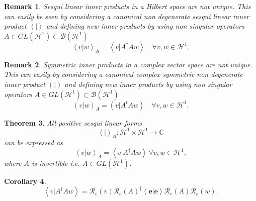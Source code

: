 \documentclass[aps,preprint]{revtex4}%
\newtheorem{theorem}{Theorem}
\newtheorem{corollary}[theorem]{Corollary}
\newtheorem{remark}[theorem]{Remark}
\begin{document}
\begin{remark}
\emph{Sesqui linear inner products in a Hilbert space are not unique. This can
easily be seen by considering a canonical non degenerate sesqui linear inner
product }$\left\langle \left.  {}\right\vert \right\rangle $ \emph{and
defining new inner products} by using non singular operators $A\in GL\left(
\mathcal{H}^{1}\right)  \subset\mathcal{B}\left(  \mathcal{H}^{1}\right)  $
\emph{ }%
\begin{equation}
\left\langle \left.  v\right\vert w\right\rangle _{A}=\left\langle \left.
v\right\vert A^{\dagger}Aw\right\rangle \quad\forall v,w\in\mathcal{H}^{1}.
\end{equation}

\end{remark}

\begin{remark}
\emph{Symmetric inner products in a complex vector space are not unique. This
can easily by considering a canonical complex symmetric non degenerate inner
product }$\left(  \left.  {}\right\vert \right)  $ and \emph{defining new
inner products} by using non singular operators $A\in GL\left(  \mathcal{H}%
^{1}\right)  \subset\mathcal{B}\left(  \mathcal{H}^{1}\right)  $ \emph{ }%
\begin{equation}
\left(  \left.  v\right\vert w\right)  _{A}=\left(  \left.  v\right\vert
A^{t}Aw\right)  \quad\forall v,w\in\mathcal{H}^{1}.
\end{equation}

\end{remark}

\begin{theorem}
All positive sesqui linear forms
\begin{equation}
\left\langle \left.  {}\right\vert \right\rangle _{A}:\mathcal{H}^{1}%
\times\mathcal{H}^{1}\rightarrow\mathbb{C}%
\end{equation}
can be expressed as
\begin{equation}
\left\langle \left.  v\right\vert w\right\rangle _{A}=\left\langle \left.
v\right\vert A^{\dagger}Aw\right\rangle \,\forall v,w\in\mathcal{H}^{1},
\end{equation}
where $A$ is invertible i.e. $A\in GL\left(  \mathcal{H}^{1}\right)  $.
\end{theorem}

\begin{corollary}%
\begin{equation}
\left\langle \left.  v\right\vert A^{\dagger}Aw\right\rangle =\mathcal{R}%
_{e}\left(  v\right)  \mathcal{R}_{e}\left(  A\right)  ^{\dagger}\left\langle
\left.  \mathbf{e}\right\vert \mathbf{e}\right\rangle \mathcal{R}_{e}\left(
A\right)  \mathcal{R}_{e}\left(  w\right)  .
\end{equation}

\end{corollary}
\end{document}
